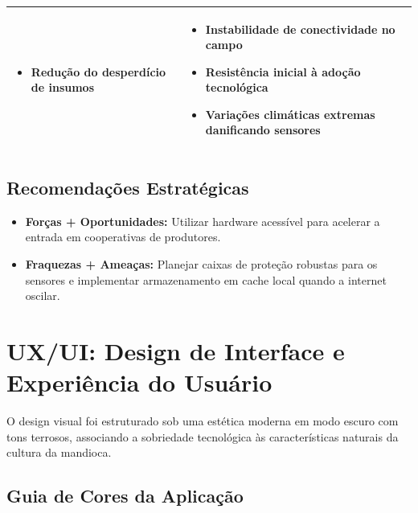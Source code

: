 \documentclass[11pt,a4paper]{article}
\begin{document}
\begin{table}[H]
\begin{tabular}{|p{7.2cm}|p{7.2cm}|}
\begin{minipage}[t]{7cm}
\begin{itemize}[leftmargin=*]
    \item Redução do desperdício de insumos
\end{itemize}
\end{minipage}
&
\begin{minipage}[t]{7cm}
\begin{itemize}[leftmargin=*]
    \item Instabilidade de conectividade no campo
    \item Resistência inicial à adoção tecnológica
    \item Variações climáticas extremas danificando sensores
\end{itemize}
\end{minipage}
\\
\hline
\end{tabular}
\end{table}

\subsection{Recomendações Estratégicas}
\begin{itemize}
    \item \textbf{Forças + Oportunidades:} Utilizar hardware acessível para acelerar a entrada em cooperativas de produtores.
    \item \textbf{Fraquezas + Ameaças:} Planejar caixas de proteção robustas para os sensores e implementar armazenamento em cache local quando a internet oscilar.
\end{itemize}

\section{UX/UI: Design de Interface e Experiência do Usuário}

O design visual foi estruturado sob uma estética moderna em modo escuro com tons terrosos, associando a sobriedade tecnológica às características naturais da cultura da mandioca.

\subsection{Guia de Cores da Aplicação}
\end{document}
